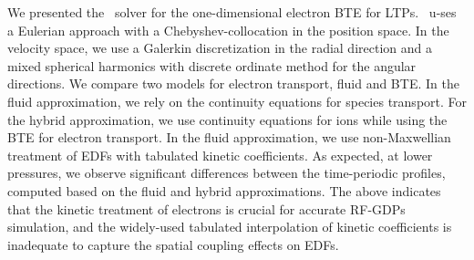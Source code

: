 We presented the \bte~solver for the one-dimensional electron BTE for LTPs. \bte~u-ses a Eulerian approach with a Chebyshev-collocation in the position space. In the velocity space, we use a Galerkin discretization in the radial direction and a mixed spherical harmonics with discrete ordinate method for the angular directions. We compare two models for electron transport, fluid and BTE. In the fluid approximation, we rely on the continuity equations for species transport. For the hybrid approximation, we use continuity equations for ions while using the BTE for electron transport. In the fluid approximation, we use non-Maxwellian treatment of EDFs with tabulated kinetic coefficients. As expected, at lower pressures, we observe significant differences between the time-periodic profiles, computed based on the fluid and hybrid approximations. The above indicates that the kinetic treatment of electrons is crucial for accurate RF-GDPs simulation, and the widely-used tabulated interpolation of kinetic coefficients is inadequate to capture the spatial coupling effects on EDFs. 



